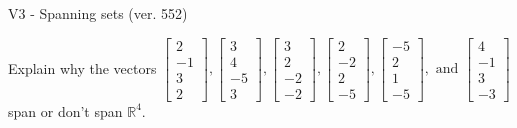 \begin{exercise}
  \begin{exerciseTitle}V3 - Spanning sets (ver. 552)\end{exerciseTitle}
  \begin{exerciseStatement}
    Explain why the vectors \(\left[\begin{array}{r}
2 \\
-1 \\
3 \\
2
\end{array}\right] , \left[\begin{array}{r}
3 \\
4 \\
-5 \\
3
\end{array}\right] , \left[\begin{array}{r}
3 \\
2 \\
-2 \\
-2
\end{array}\right] , \left[\begin{array}{r}
2 \\
-2 \\
2 \\
-5
\end{array}\right] , \left[\begin{array}{r}
-5 \\
2 \\
1 \\
-5
\end{array}\right] , \text{ and } \left[\begin{array}{r}
4 \\
-1 \\
3 \\
-3
\end{array}\right]\) span or don't span \(\mathbb{R}^4\). 
	



\end{exerciseStatement}
\end{exercise}
